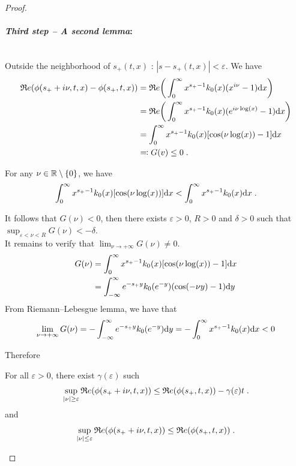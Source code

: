 \documentclass[11pt]{amsart}
\renewcommand{\Re}{\mathfrak{R}e}
\begin{document}
\begin{proof}
\medskip
\paragraph{\textit{Third step -- A second lemma}:}\mbox{}\\
Outside the neighborhood of $s_+(t,x)$ : $|s - s_+(t,x)| < \varepsilon$. We have
\begin{align*}
    \Re(\phi(s_+ + i \nu, t, x) - \phi(s_+, t, x)) 
    &=
    \Re \bigg( \int_0^\infty x^{s_+ - 1}k_0(x) (x^{i\nu} - 1) \dx \bigg) \\
    &=
    \Re \bigg( \int_0^\infty x^{s_+ - 1}k_0(x) (e^{i\nu \log(x)}- 1) \dx \bigg) \\ 
    &= 
    \int_0^\infty x^{s_+ - 1}k_0(x) [\cos(\nu \log(x))- 1] \dx  \\
    &\eqqcolon G(v) \leq 0
    \eqfinp
\end{align*}

For any $\nu \in \mathbb{R} \setminus \{0\}$, we have
\begin{equation}
 \int_0^\infty x^{s_+ - 1}k_0(x) [\cos(\nu \log(x))] \mathrm dx < \int_0^\infty x^{s_+ - 1}k_0(x) \mathrm dx
 \; .
\end{equation}

It follows that $G(\nu) < 0$, then there exists $\varepsilon > 0$, $R >0$ and $\delta > 0$
such that $\sup_{\varepsilon < \nu < R}G(\nu) < - \delta$.\\

It remains to verify that $\lim_{\nu \to +\infty}G(\nu) \neq 0$. 
\begin{align*}
    G(\nu) 
    &=  \int_0^\infty x^{s_+ - 1}k_0(x) [\cos(\nu \log(x))- 1] \mathrm dx \\
    &=  \int_{-\infty}^\infty e^{-s_+ y}k_0(e^{-y})(\cos(-\nu y) - 1 )\mathrm dy
    \end{align*}
From Riemann--Lebesgue lemma, we have that 
\begin{equation}
    \lim_{\nu \to +\infty}G(\nu) = - \int_{-\infty}^\infty e^{-s_+ y}k_0(e^{-y})\mathrm dy = - \int_{0}^\infty x^{s_+ - 1}k_0(x)\mathrm dx < 0
\end{equation}

Therefore
\begin{lemma} For all $\varepsilon > 0$, there exist $\gamma(\varepsilon)$ such
\begin{equation}
    \sup_{|\nu| \geq \varepsilon } \Re(\phi(s_+ + i \nu, t, x)) \leq \Re(\phi(s_+, t, x)) - \gamma(\varepsilon)t
    \eqfinp
\end{equation}
and
\begin{equation}
    \sup_{|\nu| \leq \varepsilon } \Re(\phi(s_+ + i \nu, t, x)) \leq \Re(\phi(s_+, t, x))
    \eqfinp
\end{equation}
\end{lemma}


\end{proof}
\end{document}

